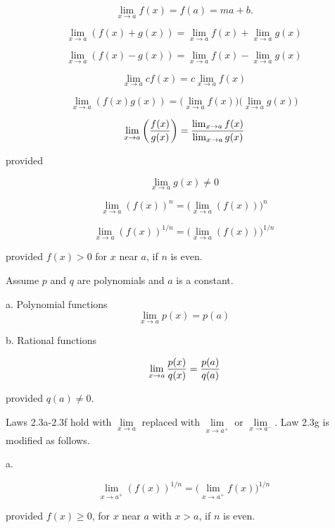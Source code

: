 $$\
\lim_{x \to a} {f(x)} = f(a) = ma + b.
$$
\endthm

$$\
\lim_{x \to a}{
(f(x) + g(x))
} =
\lim_{x \to a}{f(x)} +
\lim_{x \to a}{g(x)} 
$$
\endthm

$$\
\lim_{x \to a}{
(f(x) - g(x))
} =
\lim_{x \to a}{f(x)} -
\lim_{x \to a}{g(x)} 
$$
\endthm

$$\
\lim_{x \to a}{
cf(x)
} =
c\lim_{x \to a}{f(x)}
$$
\endthm

$$\
\lim_{x \to a}{
(f(x)g(x))
} =
\bigg(
\lim_{x \to a}{f(x)}
\bigg)
\bigg(
\lim_{x \to a}{g(x)} 
\bigg)
$$
\endthm

$$\
\lim_{x \to a}{
\bigg(
{
f(x)
\over
g(x)
}
\bigg)
} =
{
{\lim_{x \to a}{f(x)}}
\over
{\lim_{x \to a}{g(x)}}
}
$$

provided

$$\
\lim_{x \to a}{g(x)} \ne 0
$$
\endthm

$$\
\lim_{x \to a}{
(f(x))^n
}
=
\big(
\lim_{x \to a}{
(f(x))
}
\big)^n
$$
\endthm

$$\
\lim_{x \to a}{
(f(x))^{1/n}
}
=
\big(
\lim_{x \to a}{
(f(x))
}
\big)^{1/n}
$$

provided $f(x) > 0$ for $x$ near $a$, if $n$ is even.
\endthm

Assume $p$ and $q$ are polynomials and $a$ is a constant.

\par a. Polynomial functions
$$\
\lim_{x \to a} p(x) = p(a)
$$


\par b. Rational functions

$$\
\lim_{x \to a} {p(x) \over q(x)} = {p(a) \over q(a)}
$$

provided $q(a) \ne 0$.
\endthm

Laws 2.3a-2.3f hold with $\lim\limits_{x \to a}$ replaced with
$\lim\limits_{x \to a^+}$ or $\lim\limits_{x \to a^-}$. Law 2.3g is
modified as follows.

\par a.

$$\
\lim_{x \to a^+}(f(x))^{1/n} =
\bigg(
\lim_{x \to a^+} f(x)
\bigg)^{1/n}
$$

provided $f(x) \ge 0$, for $x$ near $a$ with $x > a$, if $n$ is even.

